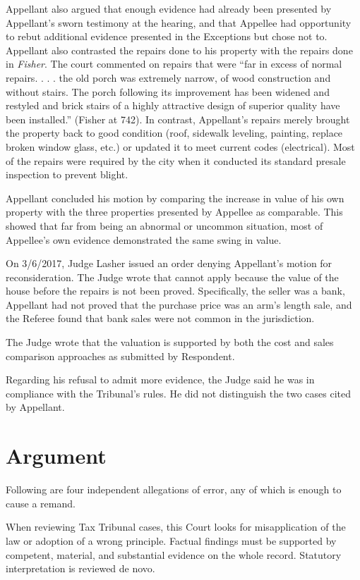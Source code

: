 \documentclass[12pt,\documentclassflag]{michiganCourtOfAppealsBrief}
\begin{document}
Appellant also argued that enough evidence had already been presented by Appellant's sworn testimony at the hearing, and that Appellee had opportunity to rebut additional evidence presented in the Exceptions but chose not to.
Appellant also contrasted the repairs done to his property with the repairs done in \textit{Fisher}. The court commented on repairs that were ``far in excess of normal repairs. . . . the old porch was extremely narrow, of wood construction and without stairs. The porch following its improvement has been widened and restyled and brick stairs of a highly attractive design of superior quality have been installed.'' (Fisher at 742). In contrast, Appellant's repairs merely brought the property back to good condition (roof, sidewalk leveling, painting, replace broken window glass, etc.) or updated it to meet current codes (electrical). Most of the repairs were required by the city when it conducted its standard presale inspection to prevent blight.

Appellant concluded his motion by comparing the increase in value of his own property with the three properties presented by Appellee as comparable. This showed that far from being an abnormal or uncommon situation, most of Appellee's own evidence demonstrated the same swing in value. 

On 3/6/2017, Judge Lasher issued an order denying Appellant's motion for reconsideration. The Judge wrote that  cannot apply because the value of the house before the repairs is not been proved. Specifically, the seller was a bank, Appellant had not proved that the purchase price was an arm's length sale, and the Referee found that bank sales were not common in the jurisdiction. 

The Judge wrote that the valuation is supported by both the cost and sales comparison approaches as submitted by Respondent. 

Regarding his refusal to admit more evidence, the Judge said he was in compliance with the Tribunal's rules. He did not distinguish the two cases cited by Appellant. 



\section{Argument}
Following are four independent allegations of error, any of which is enough to cause a remand. 

When reviewing Tax Tribunal cases, this Court looks for misapplication of the law or adoption of a wrong principle. Factual findings must be supported by competent, material, and substantial evidence on the whole record. Statutory interpretation is reviewed de novo. 
\end{document}
